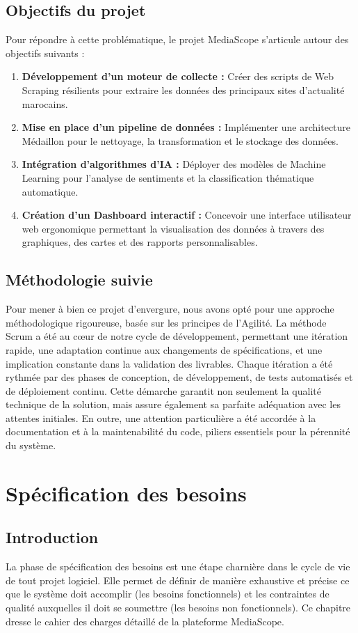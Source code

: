 \documentclass[12pt,a4paper,oneside]{report}
\newcommand{\texteMethodo}{
Pour mener à bien ce projet d'envergure, nous avons opté pour une approche méthodologique rigoureuse, basée sur les principes de l'Agilité. La méthode Scrum a été au cœur de notre cycle de développement, permettant une itération rapide, une adaptation continue aux changements de spécifications, et une implication constante dans la validation des livrables. Chaque itération a été rythmée par des phases de conception, de développement, de tests automatisés et de déploiement continu. Cette démarche garantit non seulement la qualité technique de la solution, mais assure également sa parfaite adéquation avec les attentes initiales. En outre, une attention particulière a été accordée à la documentation et à la maintenabilité du code, piliers essentiels pour la pérennité du système.
}
\begin{document}
\section{Objectifs du projet}
Pour répondre à cette problématique, le projet MediaScope s'articule autour des objectifs suivants :
\begin{enumerate}[label=\textbf{\textcolor{primary}{\arabic*.}}, itemsep=8pt]
    \item \textbf{Développement d'un moteur de collecte :} Créer des scripts de Web Scraping résilients pour extraire les données des principaux sites d'actualité marocains.
    \item \textbf{Mise en place d'un pipeline de données :} Implémenter une architecture Médaillon pour le nettoyage, la transformation et le stockage des données.
    \item \textbf{Intégration d'algorithmes d'IA :} Déployer des modèles de Machine Learning pour l'analyse de sentiments et la classification thématique automatique.
    \item \textbf{Création d'un Dashboard interactif :} Concevoir une interface utilisateur web ergonomique permettant la visualisation des données à travers des graphiques, des cartes et des rapports personnalisables.
\end{enumerate}

\section{Méthodologie suivie}
\texteMethodo

\newpage

\chapter{Spécification des besoins}

\section{Introduction}
La phase de spécification des besoins est une étape charnière dans le cycle de vie de tout projet logiciel. Elle permet de définir de manière exhaustive et précise ce que le système doit accomplir (les besoins fonctionnels) et les contraintes de qualité auxquelles il doit se soumettre (les besoins non fonctionnels). Ce chapitre dresse le cahier des charges détaillé de la plateforme MediaScope.
\end{document}
